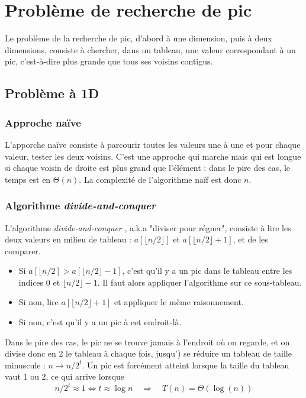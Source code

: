 \documentclass[12pt,a4paper]{book}
\newcommand{\divc}{\textit{divide-and-conquer} }
\begin{document}
\chapter{Problème de recherche de pic}
Le problème de la recherche de pic, d'abord à une dimension, puis à deux dimensions, consiste à chercher, dans un tableau, une valeur correspondant à un pic, c'est-à-dire plus grande que tous ses voisins contigus.
\section{Problème à 1D}
\subsection{Approche naïve}
L'apporche naïve consiste à parcourir toutes les valeurs une à une et pour chaque valeur, tester les deux voisins. C'est une approche qui marche mais qui est longue si chaque voisin de droite est plus grand que l'élément : dans le pire des cas, le temps est en $\Theta(n)$. La complexité de l'algorithme naïf est donc $n$.
\subsection{Algorithme \divc}
L'algorithme \divc, a.k.a "diviser pour régner", consiste à lire les deux valeurs en milieu de tableau : $a[\lfloor n/2\rfloor]$ et $a[\lfloor{n/2}\rfloor+1]$, et de les comparer. 

\begin{itemize}
\item Si $a[\lfloor{n/2}] > a[\lfloor{n/2}\rfloor-1]$, c'est qu'il y a un pic dans le tableau entre les indices $0$ et $\lfloor{n/2}\rfloor -1$. Il faut alors appliquer l'algorithme sur ce sous-tableau.

\item Si non, lire $a[\lfloor{n/2}\rfloor+1]$ et appliquer le même raisonnement.

\item Si non, c'est qu'il y a un pic à cet endroit-là.
\end{itemize} 
Dans le pire des cas, le pic ne se trouve jamais à l'endroit où on regarde, et on divise donc en 2 le tableau à chaque fois, jusqu') se réduire un tableau de taille minuscule : $n \rightarrow n/2^t$. Un pic est forcément atteint lorsque la taille du tableau vaut 1 ou 2, ce qui arrive lorsque 
$$n/2^t\approx 1 \iff t \approx \log n \quad \Longrightarrow \quad  \boxed{T(n) = \Theta\left(\log(n)\right)}$$
\end{document}

